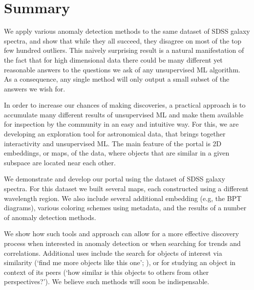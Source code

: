 \documentclass[fleqn,usenatbib]{mnras}
\begin{document}
{\section{Summary}
\label{sec:sum}

We apply various  anomaly detection methods to the same dataset of SDSS galaxy spectra,  and show that while they all succeed, they disagree on most of the top few hundred outliers. This naively surprising result is a natural manifestation of the fact that for high dimensional data there could be many  different yet reasonable answers to the questions we ask of any unsupervised ML algorithm. As a consequence, any single method will only output  a small subset of the answers we wish for. 


In order to increase our chances of making discoveries, a practical approach is to accumulate many different results of unsupervised ML and make them available for inspection by the community in an  easy and intuitive way.  For this, we are developing an exploration tool for astronomical data, that brings together interactivity and unsupervised ML. The main feature of the portal is 2D embeddings, or maps, of the data, where objects that are similar in a given subspace are located near each other.  

We demonstrate and develop our portal using the dataset of SDSS galaxy spectra. For this dataset we built several maps, each constructed using a different wavelength region. We also include several additional embedding (e.g, the BPT diagrams), various coloring schemes using metadata, and the results of a number of anomaly detection methods. 

We show how such tools and approach can allow for a more effective discovery process when interested in anomaly detection or when searching for trends and correlations. Additional uses include the search for objects of interest via similarity (`find me more objects like this one'; \citealt{reis18a}), or for studying an object in context of its peers (`how similar is this objects to others from other perspectives?'). We believe such methods will soon be indispensable. 



}
\end{document}
